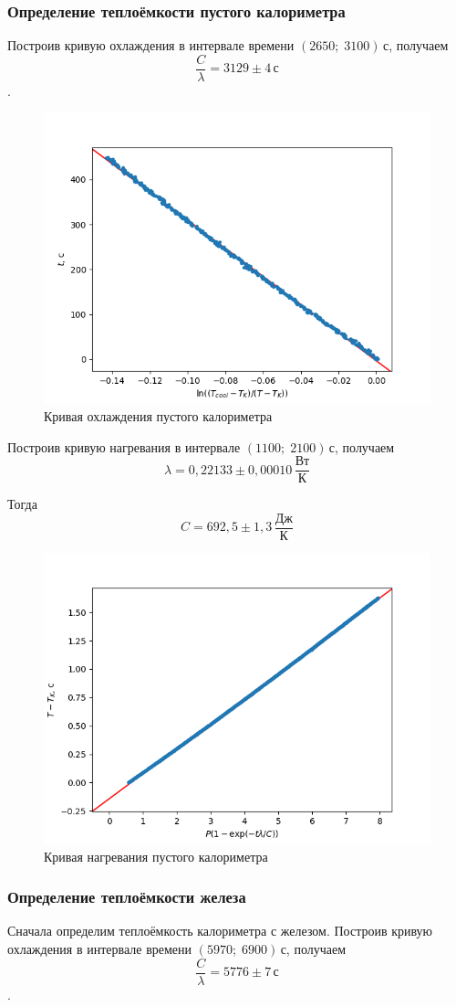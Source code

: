 \documentclass[a4paper, 12pt]{article}
\begin{document}
    \subsubsection{Определение теплоёмкости пустого калориметра}
    Построив кривую охлаждения в интервале времени $(2650;\;3100)\,\text{с}$,
    получаем $$\frac{C}{\lambda}=3129\pm 4\,\text{с}$$.
    \begin{figure}[ht!]
        \centering\includegraphics[width=0.6\linewidth]{img/lce.png}
        \caption{Кривая охлаждения пустого калориметра}
    \end{figure}

    Построив кривую нагревания в интервале $(1100;\;2100)\,\text{с}$, получаем
    $$\lambda=0{,}22133\pm 0{,}00010\,\frac{\text{Вт}}{\text{К}}$$

    Тогда $$C=692{,}5\pm 1{,}3\,\frac{\text{Дж}}{\text{К}}$$

    \begin{figure}[ht!]
        \centering\includegraphics[width=0.6\linewidth]{img/lhe.png}
        \caption{Кривая нагревания пустого калориметра}
    \end{figure}

    \subsubsection{Определение теплоёмкости железа}
    Сначала определим теплоёмкость калориметра с железом.
    Построив кривую охлаждения в интервале времени $(5970;\;6900)\,\text{с}$,
    получаем $$\frac{C}{\lambda}=5776\pm 7\,\text{с}$$.
\end{document}
